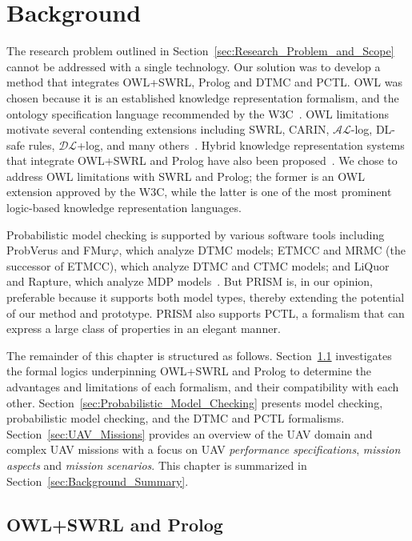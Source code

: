 \chapter{Background}
\label{chap:Background}

The research problem outlined in Section~\ref{sec:Research_Problem_and_Scope} cannot be addressed with a single technology. Our solution was to develop a method that integrates OWL+SWRL, Prolog and DTMC and PCTL\@. OWL was chosen because it is an established knowledge representation formalism, and the ontology specification language recommended by the W3C~\cite{Horrocks_2011}. OWL limitations motivate several contending extensions including SWRL, CARIN, $\mathcal{AL}$-log, DL-safe rules, $\mathcal{DL}$+log, and many others~\cite{Motik_2006}. Hybrid knowledge representation systems that integrate OWL+SWRL and Prolog have also been proposed~\cite{Sensoy_2011,Matzner_2007,Papadakis_2011,Samuel_2008,Lukacsy_2009a,Almendros_Jimenez_2011,Elenius_2012}. We chose to address OWL limitations with SWRL and Prolog; the former is an OWL extension approved by the W3C, while the latter is one of the most prominent logic-based knowledge representation languages.

Probabilistic model checking is supported by various software tools including ProbVerus and FMur$\varphi$, which analyze DTMC models; ETMCC and MRMC (the successor of ETMCC), which analyze DTMC and CTMC models; and LiQuor and Rapture, which analyze MDP models~\cite{Baier_2008}. But PRISM is, in our opinion, preferable because it supports both model types, thereby extending the potential of our method and prototype. PRISM also supports PCTL, a formalism that can express a large class of properties in an elegant manner.

The remainder of this chapter is structured as follows. Section~\ref{sec:OWL_SWRL_and_Prolog} investigates the formal logics underpinning OWL+SWRL and Prolog to determine the advantages and limitations of each formalism, and their compatibility with each other. Section~\ref{sec:Probabilistic_Model_Checking} presents model checking, probabilistic model checking, and the DTMC and PCTL formalisms. Section~\ref{sec:UAV_Missions} provides an overview of the UAV domain and complex UAV missions with a focus on UAV \emph{performance specifications}, \emph{mission aspects} and \emph{mission scenarios}. This chapter is summarized in Section~\ref{sec:Background_Summary}.

\section{OWL+SWRL and Prolog}
\label{sec:OWL_SWRL_and_Prolog}

